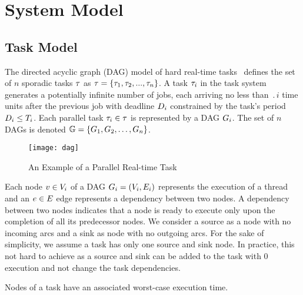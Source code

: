 \section{System Model}

\subsection{Task Model}
The directed acyclic graph (DAG) model of hard real-time
tasks~\addcite{} defines the set of ${n}$ sporadic tasks $\tau$ as
$\tau{} = \{\tau_{1},\tau_{2}, ..., \tau_{n}\}$. A task $\tau_{i}$
in the task system generates a potentially infinite number of jobs,
each arriving no less than $\period{i}$ time units after the previous
job with deadline ${D_{i}}$ constrained by the task's period
$D_{i} \leq T_{i}$. Each parallel task $\tau_{i} \in
\tau$ is represented by a DAG ${\Dag{i}}$. The set of ${n}$ DAGs is
denoted ${\dagset = \{\Dag{1}, \Dag{2}, \ldots, \Dag{n}\}}$. 

\begin{figure}[!h]
  \centering
  \texttt{[image: dag]}
  \caption{An Example of a Parallel Real-time Task}
  \label{fig:dag}
  
\end{figure}

Each node ${\node{1} \in \nodeset{i}}$ of a DAG ${\Dag{i} =
  (\nodeset{i}, \edgeset{i})}$ represents the 
execution of a thread and an ${\edge \in \edgeset{}}$ edge represents a
dependency between two nodes. A dependency between two nodes indicates
that a node is ready to execute only upon the completion of all its
predecessor nodes. We consider a source as a node with no incoming
arcs and a sink as node with no outgoing arcs. For the sake of
simplicity, we assume a task has only one source and sink node. In
practice, this not hard to achieve as a source and sink can be added
to the task with $0$ execution and not change the task dependencies.

Nodes of a task have an associated worst-case execution time. 

